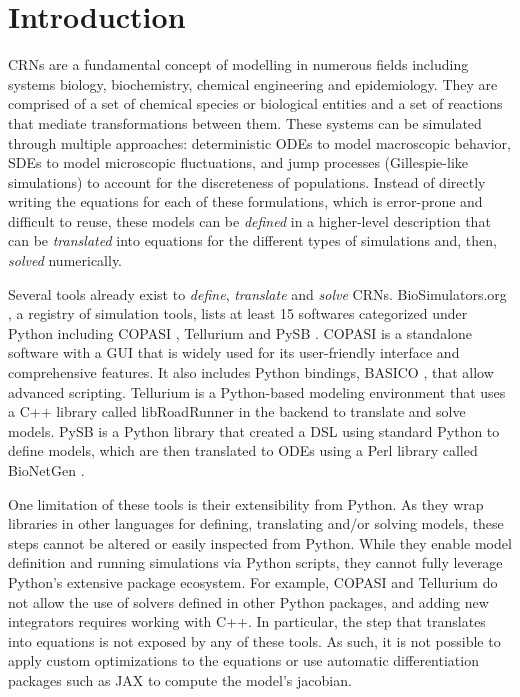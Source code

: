 \documentclass[namedate,numsec,webpdf,modern,large]{oup-authoring-template}
\theoremstyle{thmstyleone}%
\theoremstyle{thmstyletwo}%
\theoremstyle{thmstylethree}%
\begin{document}
\maketitle


\section{Introduction}

\Acp{CRN} are a fundamental concept of modelling in numerous fields
including systems biology, biochemistry, chemical engineering and epidemiology.
They are comprised of a set of chemical species or biological entities
and a set of reactions that mediate transformations between them.
These systems can be simulated through multiple approaches:
deterministic \acp{ODE} to model macroscopic behavior,
\acp{SDE} to model microscopic fluctuations,
and jump processes (Gillespie-like simulations) to account for the discreteness of populations.
Instead of directly writing the equations for each of these formulations,
which is error-prone and difficult to reuse,
these models can be \emph{defined} in a higher-level description
that can be \emph{translated} into equations for the different types of simulations
and, then, \emph{solved} numerically.

Several tools already exist to \emph{define}, \emph{translate} and \emph{solve} \acp{CRN}.
BioSimulators.org \citep{shaikhBioSimulatorsCentralRegistry2022},
a registry of simulation tools,
lists at least 15 softwares categorized under Python including
COPASI \citep{hoopsCOPASICOmplexPAthway2006},
Tellurium \citep{choiTelluriumExtensiblePythonbased2018} and
PySB \citep{lopezProgrammingBiologicalModels2013}.
COPASI is a standalone software with a \ac{GUI}
that is widely used for its user-friendly interface and comprehensive features.
It also includes Python bindings, BASICO \citep{bergmannBASICOSimplifiedPython2023b}, that allow advanced scripting.
Tellurium is a Python-based modeling environment
that uses a C++ library called libRoadRunner \citep{welshLibRoadRunnerHighPerformance2023} in the backend to translate and solve models.
PySB is a Python library that created a \ac{DSL} using standard Python to define models,
which are then translated to \acp{ODE} using a Perl library called BioNetGen \citep{harrisBioNetGenAdvancesRulebased2016}.

One limitation of these tools is their extensibility from Python.
As they wrap libraries in other languages for defining, translating and/or solving models,
these steps cannot be altered or easily inspected from Python.
While they enable model definition and running simulations via Python scripts,
they cannot fully leverage Python's extensive package ecosystem.
For example,
COPASI and Tellurium do not allow the use of solvers defined in other Python packages,
and adding new integrators requires working with C++.
In particular, the step that translates into equations is not exposed by any of these tools.
As such, it is not possible to apply custom optimizations to the equations
or use automatic differentiation packages such as JAX \citep{jax2018github} to compute the model's jacobian.
\end{document}
